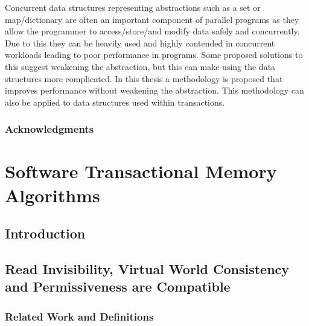 \documentclass[11pt]{book}
\begin{document}
Concurrent data structures representing abstractions such as a set or map/dictionary are often
an important component of parallel programs as they allow the programmer to access/store/and modify
data safely and concurrently.
Due to this they can be heavily used and highly contended in concurrent workloads leading to poor performance
in programs.
Some proposed solutions to this suggest weakening the abstraction, but this can make using the data structures
more complicated.
In this thesis a methodology is proposed that improves performance without weakening the abstraction.
This methodology can also be applied to data structures used within transactions.





\newpage

\section*{Acknowledgments}
%

\sloppy

\tableofcontents      	%
\listoffigures        	%
\clearpage




\part{Software Transactional Memory Algorithms}

\chapter{Introduction}
%

\chapter{Read Invisibility, Virtual World Consistency and Permissiveness are Compatible}
\label{chap:soc}

\section{Related Work and Definitions}
\end{document}
